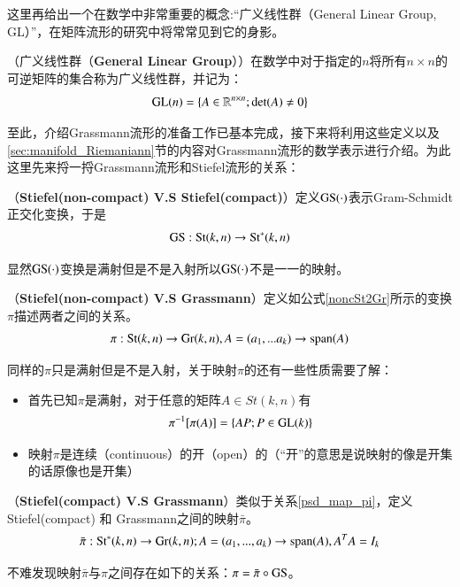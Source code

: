 这里再给出一个在数学中非常重要的概念:“广义线性群（General Linear Group, GL）”，在矩阵流形的研究中将常常见到它的身影。
\begin{definition}
\label{General_Linear_Group}
{\heiti （广义线性群（\textbf{General Linear Group}））}在数学中对于指定的$n$将所有$n\times n$的可逆矩阵的集合称为广义线性群，并记为：
\begin{equation}
{\rm GL}(n)=\{A \in \mathbb{R}^{n\times n};{\rm{det}}(A)\neq 0\}
\end{equation}
\end{definition}

至此，介绍Grassmann流形的准备工作已基本完成，接下来将利用这些定义以及\ref{sec:manifold_Riemaniann}节的内容对Grassmann流形的数学表示进行介绍。为此这里先来捋一捋Grassmann流形和Stiefel流形的关系：
\begin{rela}
\label{Relation_SS}
{\heiti （\textbf{Stiefel(non-compact) V.S Stiefel(compact)}）}定义${\rm GS}(\cdot)$表示Gram-Schmidt正交化变换，于是\begin{equation}
{\rm GS}:{\rm St}(k,n) \rightarrow {\rm St}^{*}(k,n)
\end{equation}
\end{rela}
显然${\rm GS}(\cdot)$变换是满射但是不是入射所以${\rm GS}(\cdot)$不是一一的映射。
\begin{rela}
\label{psd_map_pi}
{\heiti （\textbf{Stiefel(non-compact) V.S Grassmann}）}定义如公式\ref{noncSt2Gr}所示的变换$\pi$描述两者之间的关系。
\begin{equation}
\label{noncSt2Gr}
\pi:{\rm St}(k,n) \rightarrow {\rm Gr}(k,n),A=(a_1,...a_k)\rightarrow {\rm{span}}(A)
\end{equation}
\end{rela}
同样的$\pi$只是满射但是不是入射，关于映射$\pi$的还有一些性质需要了解：
\begin{itemize}
\item 首先已知$\pi$是满射，对于任意的矩阵$A \in St(k,n)$有
\begin{equation}
\pi^{-1}[\pi(A)]=\{AP;P\in {\rm GL}(k)\}
\end{equation}
\item 映射$\pi$是连续（continuous）的开（open）的（“开”的意思是说映射的像是开集的话原像也是开集）
\end{itemize}
\begin{rela}
{\heiti （\textbf{Stiefel(compact) V.S Grassmann}）}类似于关系\ref{psd_map_pi}，定义Stiefel(compact) 和 Grassmann之间的映射$\bar{\pi}$。
\begin{equation}
\label{cSt2Gr}
\bar{\pi}:{\rm St}^{*}(k,n)\rightarrow {\rm Gr}(k,n);A=(a_1,...,a_k)\rightarrow {\rm{span}}(A),A^{T}A=I_k 
\end{equation}
\end{rela}
不难发现映射$\bar{\pi}$与$\pi$之间存在如下的关系：$\pi=\bar{\pi}\circ {\rm GS}$。

